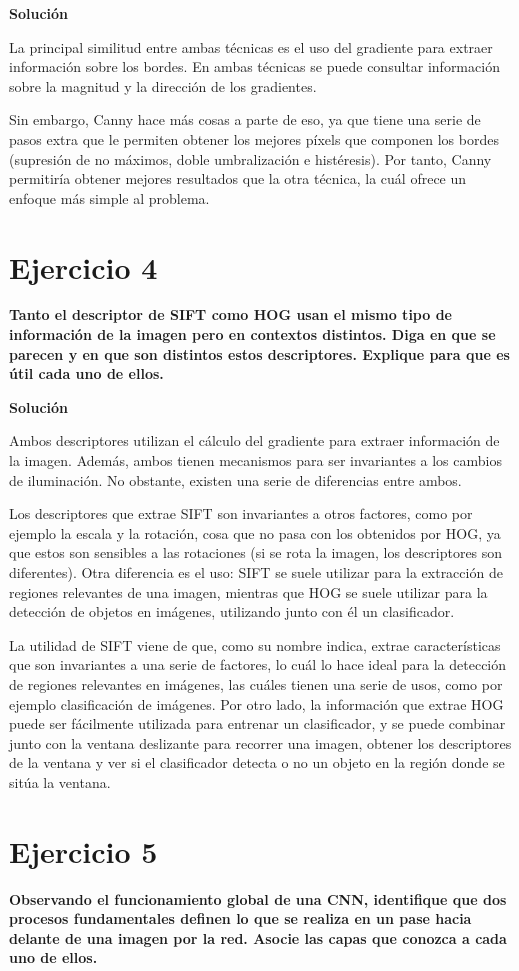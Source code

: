 \documentclass[11pt,a4paper]{article}
\newcommand{\answer}{\noindent\textbf{Solución}}
\newcommand{\question}[1]{\noindent\textbf{#1}}
\newcommand{\nonumsection}[1]{\section*{#1}\addcontentsline{toc}{section}{#1}}
\begin{document}
\answer

La principal similitud entre ambas técnicas es el uso del gradiente
para extraer información sobre los bordes. En ambas técnicas
se puede consultar información sobre la magnitud y la dirección
de los gradientes.

Sin embargo, Canny hace más cosas a parte de eso,
ya que tiene una serie de pasos extra que le permiten obtener los
mejores píxels que componen los bordes (supresión de no máximos, doble umbralización
e histéresis). Por tanto, Canny permitiría obtener mejores resultados que la
otra técnica, la cuál ofrece un enfoque más simple al problema.

\nonumsection{Ejercicio 4}

\question{Tanto el descriptor de SIFT como HOG usan el mismo tipo de
información de la imagen pero en contextos distintos. Diga en que se
parecen y en que son distintos estos descriptores. Explique para que
es útil cada uno de ellos.}

\answer

Ambos descriptores utilizan el cálculo del gradiente para extraer
información de la imagen. Además, ambos tienen mecanismos para ser
invariantes a los cambios de iluminación. No obstante, existen una
serie de diferencias entre ambos.

Los descriptores que extrae SIFT son invariantes a otros factores,
como por ejemplo la escala y la rotación, cosa
que no pasa con los obtenidos por HOG, ya que estos son sensibles a las
rotaciones (si se rota la imagen, los descriptores son diferentes). Otra
diferencia es el uso: SIFT se suele utilizar para la extracción de
regiones relevantes de una imagen, mientras que HOG se suele
utilizar para la detección de objetos en imágenes, utilizando junto con él
un clasificador.

La utilidad de SIFT viene de que, como su nombre indica,
extrae características que son invariantes a una serie de factores, lo cuál
lo hace ideal para la detección de regiones relevantes en imágenes, las
cuáles tienen una serie de usos, como por ejemplo clasificación de imágenes.
Por otro lado, la información que extrae HOG puede ser fácilmente utilizada
para entrenar un clasificador, y se puede combinar junto con la ventana deslizante
para recorrer una imagen, obtener los descriptores de la ventana y ver si
el clasificador detecta o no un objeto en la región donde se sitúa la ventana.


\nonumsection{Ejercicio 5}

\question{Observando el funcionamiento global de una CNN, identifique que
dos procesos fundamentales definen lo que se realiza en un pase hacia
delante de una imagen por la red. Asocie las capas que conozca a cada
uno de ellos.}
\end{document}
